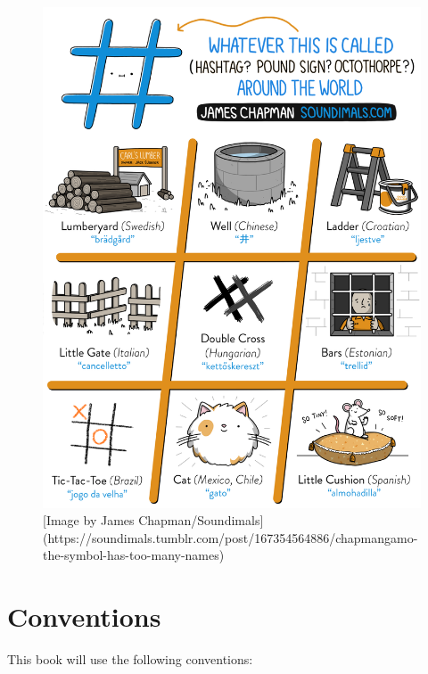 \documentclass[
  oneside]{book}
\begin{document}
\begin{figure}

{\centering \includegraphics[width=1\linewidth]{images/soundimals_hash} 

}

\caption{[Image by James Chapman/Soundimals](https://soundimals.tumblr.com/post/167354564886/chapmangamo-the-symbol-has-too-many-names)}\label{fig:img-soundimals-hash}
\end{figure}

\hypertarget{conventions}{%
\chapter{Conventions}\label{conventions}}

This book will use the following conventions:
\end{document}
